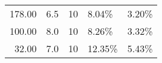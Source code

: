 \documentclass[openany]{now}
\begin{document}
\begin{table}
\begin{center}
\begin{tabular}{rrl|ll}
  178.00 &                      6.5 &                     10 &   8.04\% &   3.20\% \\
  100.00 &                      8.0 &                     10 &   8.26\% &   3.32\% \\
   32.00 &                      7.0 &                     10 &  12.35\% &   5.43\% \\

\end{tabular}
\end{center}
\end{table}
\end{document}

